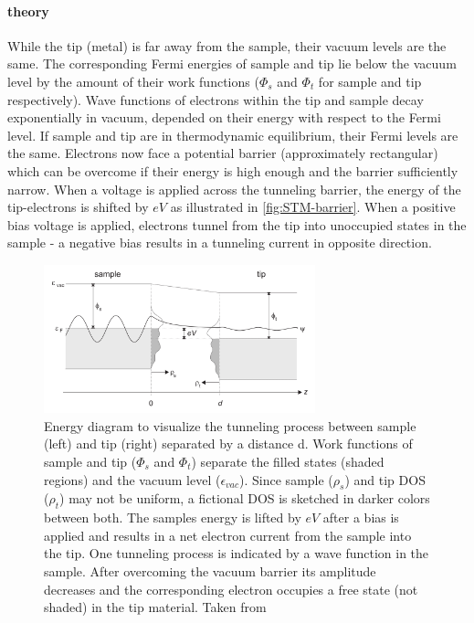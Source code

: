 \paragraph{theory}
While the tip (metal) is far away from the sample, their vacuum levels are the same. The corresponding Fermi energies of sample and tip lie below the vacuum level by the amount of their work functions ($\Phi_s$ and $\Phi_t$ for sample and tip respectively). Wave functions of electrons within the tip and sample decay exponentially in vacuum, depended on their energy with respect to the Fermi level.
If sample and tip are in thermodynamic equilibrium, their Fermi levels are the same. Electrons now face a potential barrier (approximately rectangular) which can be overcome if their energy is high enough and the barrier sufficiently narrow. When a voltage is applied across the tunneling barrier, the energy of the tip-electrons is shifted by $eV$ as illustrated in \autoref{fig:STM-barrier}. When a positive bias voltage is applied, electrons tunnel from the tip into unoccupied states in the sample - a negative bias results in a tunneling current in opposite direction. 

\begin{figure}[]\centering
	\includegraphics[width=0.7\textwidth]{./images/tunnel-barrier.jpg}
	\caption{Energy diagram to visualize the tunneling process between sample (left) and tip (right) separated by a distance d. Work functions of sample and tip ($\Phi_s$ and $\Phi_t$) separate the filled states (shaded regions) and the vacuum level ($\epsilon_{vac}$). Since sample ($\rho_s$) and tip DOS ($\rho_t$) may not be uniform, a fictional DOS is sketched in darker colors between both. The samples energy is lifted by $eV$ after a bias is applied and results in a net electron current from the sample into the tip. One tunneling process is indicated by a wave function in the sample. After overcoming the vacuum barrier its amplitude decreases and the corresponding electron occupies a free state (not shaded) in the tip material.  Taken from \cite{diss-schunack}}
	\label{fig:STM-barrier}
\end{figure}


